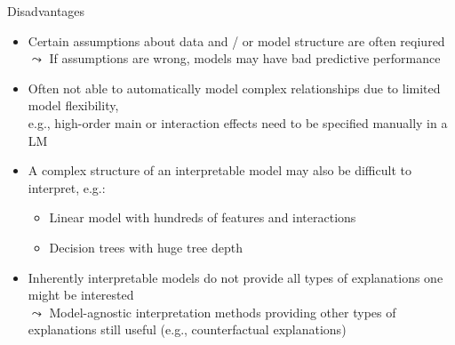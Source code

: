 \documentclass[11pt,compress,t,notes=noshow, aspectratio=169, xcolor=table]{beamer}
\begin{document}
\begin{frame}{Disadvantages}

    \begin{itemize}[<+->]
    \itemsep1em
        \item Certain assumptions about data and / or model structure are often reqiured\\
        $\leadsto$ If assumptions are wrong, models may have bad predictive performance
        \item Often not able to automatically model complex relationships due to limited model flexibility, \\
        e.g., high-order main or interaction effects need to be specified manually in a LM
        \item A complex structure of an interpretable model may also be difficult to interpret, e.g.:
        \begin{itemize}
            \item Linear model with hundreds of features and interactions 
            \item Decision trees with huge tree depth
        \end{itemize}
        \item Inherently interpretable models do not provide all types of explanations one might be interested\\
        $\leadsto$ Model-agnostic interpretation methods providing other types of explanations still useful (e.g., counterfactual explanations)
    \end{itemize}

\end{frame}
\end{document}
